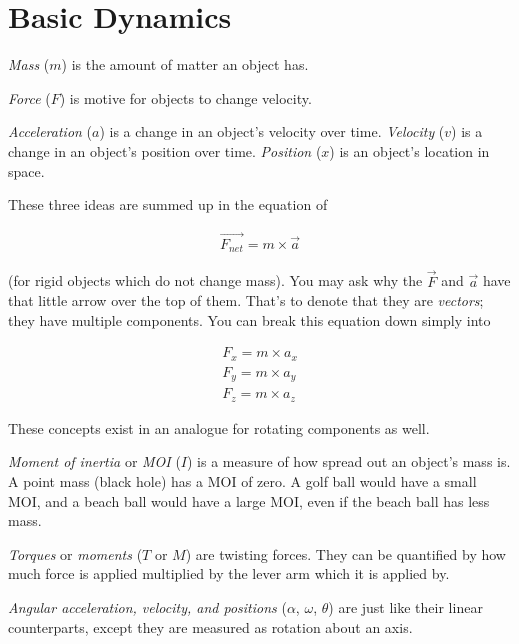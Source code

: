 \section{Basic Dynamics}

\begin{asparaenum}[a)]
	\item \textit{Mass} ($m$) is the amount of matter an object has.
	\item \textit{Force} ($F$) is motive for objects to change velocity.
	\item \textit{Acceleration} ($a$) is a change in an object's velocity over time.
	\textit{Velocity} ($v$) is a change in an object's position over time.
	\textit{Position} ($x$) is an object's location in space.
\end{asparaenum}

These three ideas are summed up in the equation of

\begin{align}
	\vec{F_{net}} = m \times \vec{a}
\end{align}

(for rigid objects which do not change mass). You may ask why the $\vec{F}$ and $\vec{a}$ have that little arrow over the top of them. That's to denote that they are \textit{vectors}; they have multiple components. You can break this equation down simply into

\begin{align}
	F_x = m \times a_x \\
	F_y = m \times a_y \\
	F_z = m \times a_z
\end{align}

These concepts exist in an analogue for rotating components as well.
\begin{asparaenum}[a)]
	\item \textit{Moment of inertia} or \textit{MOI} ($I$) is a measure of how spread out an object's mass is. A point mass (black hole) has a MOI of zero. A golf ball would have a small MOI, and a beach ball would have a large MOI, even if the beach ball has less mass.
	\item \textit{Torques} or \textit{moments} ($T$ or $M$) are twisting forces. They can be quantified by how much force is applied multiplied by the lever arm which it is applied by.
	\item \textit{Angular acceleration, velocity, and positions} ($\alpha$, $\omega$, $\theta$) are just like their linear counterparts, except they are measured as rotation about an axis.
\end{asparaenum}

